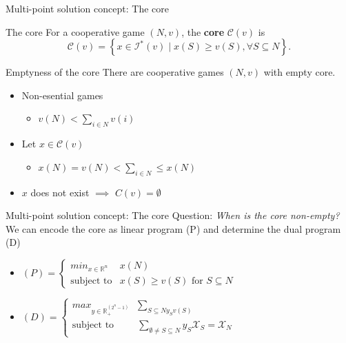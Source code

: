 \documentclass{beamer}
\newcommand{\R}{\mathbb{R}}
\newcommand{\I}{\mathcal{I}}
\begin{document}


\begin{frame}{Multi-point solution concept: The core}
    \begin{block}{The core}
    For a cooperative game $(N,v)$, the \textbf{core} $\mathcal{C}(v)$ is
    \[\mathcal{C}(v) = \left\{x \in \I^*(v) \mid x(S) \geq v(S), \forall S \subseteq N \right\}.\]
    \end{block}
    \begin{block}{Emptyness of the core}
		\pause
        There are cooperative games $\left(N,v\right)$ with empty core.
    \end{block}
    \begin{itemize}
        \item<3-> Non-esential games
        \begin{itemize}
            \item<4-> $v\left(N\right) < \sum_{i \in N}v\left(i\right)$
        \end{itemize}
        \item<5-> Let $x \in \mathcal{C}\left(v\right)$
        \begin{itemize}
            \item<6-> $x\left(N\right)=v\left(N\right)<\sum_{i\in N}\leq x\left(N\right)$ 
        \end{itemize}
        \item<7-> $x$ does not exist $\implies$ $C\left(v\right)=\emptyset$
    \end{itemize}
\end{frame}



\begin{frame}{Multi-point solution concept: The core}
    Question: \textit{When is the core non-empty?} \\ \pause
	We can encode the core as linear program (P) and determine the dual program (D)
    \begin{itemize}
		\item<3-> $\left(P\right)=\begin{cases}
			min_{x \in \R^n} & x \left(N\right) \\
			\text{subject to} &x\left(S\right) \geq v\left(S\right)\text{ for }S \subseteq N
		\end{cases}$
		\item<4-> $\left(D\right)=\begin{cases}
			max_{y \in \R_{+}^{\left(2^n-1\right)}} & \sum_{S \subseteq N y_S v\left(S\right)} \\
			\text{subject to} & \sum_{\emptyset \neq S \subseteq N} y_S \mathcal{X}_S = \mathcal{X}_N
		\end{cases}$
	\end{itemize}
	\vspace{1.4in}
\end{frame}
\end{document}
